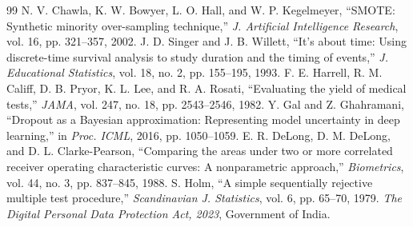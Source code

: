 \documentclass[conference]{IEEEtran}
\begin{document}
\begin{thebibliography}{99}
 N. V. Chawla, K. W. Bowyer, L. O. Hall, and W. P. Kegelmeyer, ``SMOTE: Synthetic minority
over-sampling technique,'' \emph{J. Artificial Intelligence Research}, vol. 16, pp. 321--357, 2002.
 J. D. Singer and J. B. Willett, ``It's about time: Using discrete-time survival analysis to
study duration and the timing of events,'' \emph{J. Educational Statistics}, vol. 18, no. 2, pp. 155--195, 1993.
 F. E. Harrell, R. M. Califf, D. B. Pryor, K. L. Lee, and R. A. Rosati, ``Evaluating the yield
of medical tests,'' \emph{JAMA}, vol. 247, no. 18, pp. 2543--2546, 1982.
 Y. Gal and Z. Ghahramani, ``Dropout as a Bayesian approximation: Representing model uncertainty
in deep learning,'' in \emph{Proc. ICML}, 2016, pp. 1050--1059.
 E. R. DeLong, D. M. DeLong, and D. L. Clarke-Pearson, ``Comparing the areas under two or more
correlated receiver operating characteristic curves: A nonparametric approach,'' \emph{Biometrics}, vol. 44,
no. 3, pp. 837--845, 1988.
 S. Holm, ``A simple sequentially rejective multiple test procedure,'' \emph{Scandinavian J.
Statistics}, vol. 6, pp. 65--70, 1979.
 \emph{The Digital Personal Data Protection Act, 2023}, Government of India.
\end{thebibliography}
\end{document}
